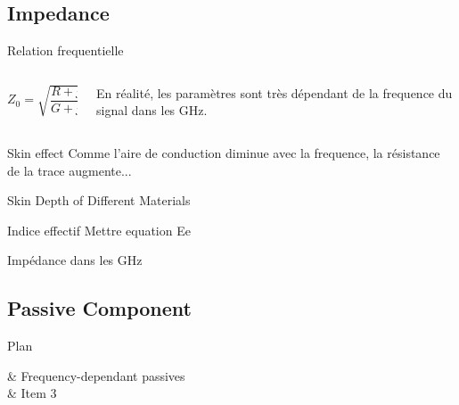 \subsection[6min-Max]{Impedance }
\maxbackground


\begin{frame}{Relation frequentielle}
    \begin{columns}
        \begin{column}{0.33\textwidth}
            \begin{center}
            $Z_0 = \sqrt{\dfrac{R + j \omega L}{G + j \omega C}}$\\
            \end{center}
        \end{column}
        \begin{column}{0.66\textwidth}
            En réalité, les paramètres sont très dépendant de la frequence du signal dans les GHz.
        \end{column}
    \end{columns}
    \vspace{30pt}
\end{frame}

\begin{frame}{Skin effect}
    Comme l'aire de conduction diminue avec la frequence, la résistance de la trace augmente...
\end{frame}

\begin{frame}{Skin Depth of Different Materials}

\end{frame}

\begin{frame}{Indice effectif}
    Mettre equation Ee
\end{frame}

\begin{frame}{Impédance dans les GHz}
\end{frame}




\subsection[5min-Pascal]{Passive Component }
\pascalbackground
\begin{frame}{Plan}
    \begin{makelist}[\small][1.5]
        \icon[red]{\faTimes} & Frequency-dependant passives\\
        \icon[red]{\faTimes} & Item 3
    \end{makelist}
\end{frame}




